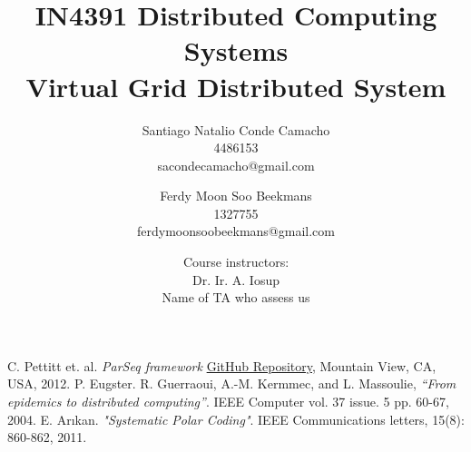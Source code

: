 \documentclass{article}
\title{\textbf{IN4391 Distributed Computing Systems \\Virtual Grid Distributed System}}
\author{Santiago Natalio Conde Camacho  \\ 4486153\\ \small{sacondecamacho@gmail.com} \and Ferdy Moon Soo Beekmans \\1327755 \\ \small{ferdymoonsoobeekmans@gmail.com}}
\date{\small{Course instructors:} \\ Dr. Ir. A. Iosup \\ Name of TA who assess us}
\begin{document}
\maketitle






\begin{thebibliography}{9}

C. Pettitt et. al. \textit{ParSeq framework} {\color{magenta}\href{https://github.com/linkedin/parseq}{GitHub Repository}}, Mountain View, CA, USA, 2012.
  P. Eugster. R. Guerraoui, A.-M. Kermmec, and L. Massoulie, \textit{“From epidemics to distributed computing”}. IEEE Computer vol. 37 issue. 5 pp. 60-67, 2004.
  E. Arıkan. \textit{"Systematic Polar Coding"}. IEEE Communications letters, 15(8): 860-862, 2011.
\end{thebibliography}
\end{document}
